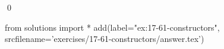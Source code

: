 
\begin{ex}
  \label{ex:17-61-constructors}
  
  \qed
\end{ex}
\begin{python0}
from solutions import *
add(label="ex:17-61-constructors",
    srcfilename='exercises/17-61-constructors/answer.tex')
\end{python0}
